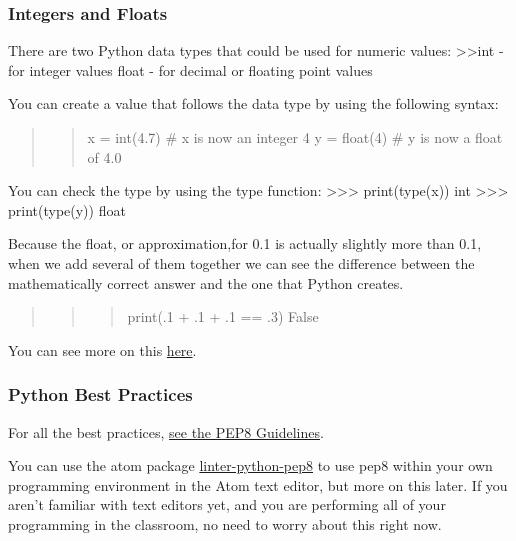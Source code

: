 \documentclass[11pt]{article}
\begin{document}
    \hypertarget{integers-and-floats}{%
\subsubsection{Integers and Floats}\label{integers-and-floats}}

There are two Python data types that could be used for numeric values:
\textgreater\textgreater int - for integer values float - for decimal or
floating point values

You can create a value that follows the data type by using the following
syntax:

\begin{quote}
\begin{quote}
x = int(4.7) \# x is now an integer 4 y = float(4) \# y is now a float
of 4.0
\end{quote}
\end{quote}

You can check the type by using the type function:
\textgreater\textgreater\textgreater{} print(type(x)) int
\textgreater\textgreater\textgreater{} print(type(y)) float

    Because the float, or approximation,for 0.1 is actually slightly more
than 0.1, when we add several of them together we can see the difference
between the mathematically correct answer and the one that Python
creates.

\begin{quote}
\begin{quote}
\begin{quote}
print(.1 + .1 + .1 == .3) False
\end{quote}
\end{quote}
\end{quote}

You can see more on this
\href{https://docs.python.org/3/tutorial/floatingpoint.html}{here}.

    \hypertarget{python-best-practices}{%
\subsubsection{Python Best Practices}\label{python-best-practices}}

For all the best practices, \href{https://peps.python.org/pep-0008/}{see
the PEP8 Guidelines}.

You can use the atom package
\href{https://github.blog/2022-06-08-sunsetting-atom/}{linter-python-pep8}
to use pep8 within your own programming environment in the Atom text
editor, but more on this later. If you aren't familiar with text editors
yet, and you are performing all of your programming in the classroom, no
need to worry about this right now.
\end{document}
